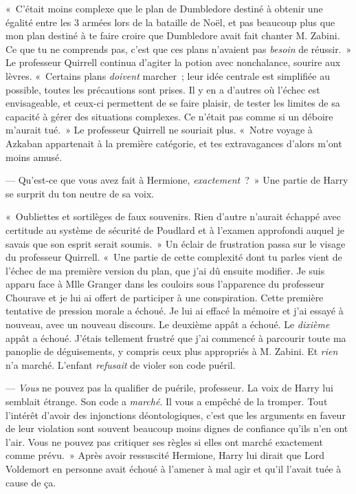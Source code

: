 «~C'était moins complexe que le plan de Dumbledore destiné à obtenir une égalité entre les 3 armées lors de la bataille de Noël, et pas beaucoup plus que mon plan destiné à te faire croire que Dumbledore avait fait chanter M. Zabini. Ce que tu ne comprends pas, c'est que ces plans n'avaient pas \emph{besoin} de réussir.~» Le professeur Quirrell continua d'agiter la potion avec nonchalance, sourire aux lèvres. «~Certains plans \emph{doivent} marcher~; leur idée centrale est simplifiée au possible, toutes les précautions sont prises. Il y en a d'autres où l'échec est envisageable, et ceux-ci permettent de se faire plaisir, de tester les limites de sa capacité à gérer des situations complexes. Ce n'était pas comme si un déboire m'aurait tué.~» Le professeur Quirrell ne souriait plus. «~Notre voyage à Azkaban appartenait à la première catégorie, et tes extravagances d'alors m'ont moins amusé.

--- Qu'est-ce que vous avez fait à Hermione, \emph{exactement}~?~» Une partie de Harry se surprit du ton neutre de sa voix.

«~Oubliettes et sortilèges de faux souvenirs. Rien d'autre n'aurait échappé avec certitude au système de sécurité de Poudlard et à l'examen approfondi auquel je savais que son esprit serait soumis.~» Un éclair de frustration passa sur le visage du professeur Quirrell. «~Une partie de cette complexité dont tu parles vient de l'échec de ma première version du plan, que j'ai dû ensuite modifier. Je suis apparu face à Mlle Granger dans les couloirs sous l'apparence du professeur Chourave et je lui ai offert de participer à une conspiration. Cette première tentative de pression morale a échoué. Je lui ai effacé la mémoire et j'ai essayé à nouveau, avec un nouveau discours. Le deuxième appât a échoué. Le \emph{dixième} appât a échoué. J'étais tellement frustré que j'ai commencé à parcourir toute ma panoplie de déguisements, y compris ceux plus appropriés à M. Zabini. Et \emph{rien} n'a marché. L'enfant \emph{refusait} de violer son code puéril.

--- \emph{Vous} ne pouvez pas la qualifier de puérile, professeur. La voix de Harry lui semblait étrange. Son code a \emph{marché}. Il vous a empêché de la tromper. Tout l'intérêt d'avoir des injonctions déontologiques, c'est que les arguments en faveur de leur violation sont souvent beaucoup moins dignes de confiance qu'ils n'en ont l'air. Vous ne pouvez pas critiquer ses règles si elles ont marché exactement comme prévu.~» Après avoir ressuscité Hermione, Harry lui dirait que Lord Voldemort en personne avait échoué à l'amener à mal agir et qu'il l'avait tuée à cause de ça.

